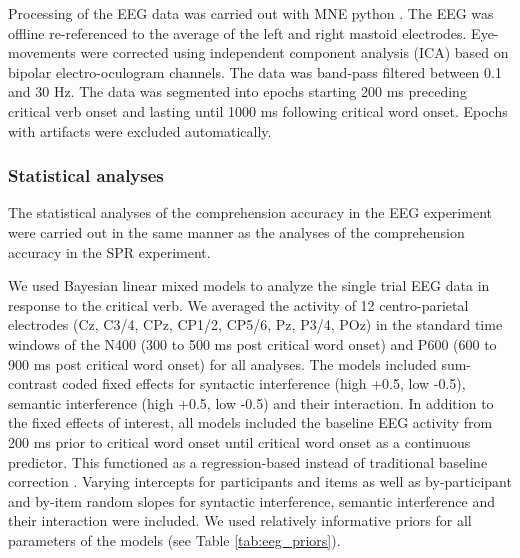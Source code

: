 \documentclass[review,preprint,12pt,authoryear,floatsintext]{elsarticle}
\begin{document}
Processing of the EEG data was carried out with MNE python \citep{mne}. The EEG was offline re-referenced to the average of the left and right mastoid electrodes. Eye-movements were corrected using independent component analysis (ICA) based on bipolar electro-oculogram channels. The data was band-pass filtered between 0.1 and 30 Hz. The data was segmented into epochs starting 200 ms preceding critical verb onset and lasting until 1000 ms following critical word onset. Epochs with artifacts were excluded automatically.

\subsubsection*{Statistical analyses}
The statistical analyses of the comprehension accuracy in the EEG experiment were carried out in the same manner as the analyses of the comprehension accuracy in the SPR experiment.

We used Bayesian linear mixed models to analyze the single trial EEG data in response to the critical verb. We averaged the activity of 12 centro-parietal electrodes (Cz, C3/4, CPz, CP1/2, CP5/6, Pz, P3/4, POz) in the standard time windows of the  N400 (300 to 500 ms post critical word onset) and P600 (600 to 900 ms post critical word onset) for all analyses. The models included sum-contrast coded fixed effects for syntactic interference (high +0.5, low -0.5), semantic interference (high +0.5, low -0.5) and their interaction. In addition to the fixed effects of interest, all models included the baseline EEG activity from 200 ms prior to critical word onset until critical word onset as a continuous predictor. This functioned as a regression-based instead of traditional baseline correction \citep{alday2019}. Varying intercepts for participants and items as well as by-participant and by-item random slopes for syntactic interference, semantic interference and their interaction were included. We used relatively informative priors for all parameters of the models (see Table \ref{tab:eeg_priors}). 
\end{document}
